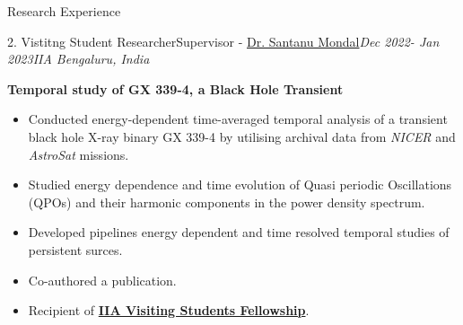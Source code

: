 \begin{section}{Research Experience}
\begin{subsectionnobullet1}{2. Vistitng Student Researcher}{Supervisor - \href{https://www.iiap.res.in/people/profile/academic/santanu-mondal/}{Dr. Santanu Mondal}}{\textit{Dec 2022- Jan 2023}}{\textit{IIA Bengaluru, India}}{}

        \textbf{Temporal study of GX 339-4, a Black Hole Transient}
        \begin{itemize}
            \item Conducted energy-dependent time-averaged temporal analysis of a transient black hole X-ray binary GX 339-4 by utilising archival data from \textit{NICER} and \textit{AstroSat} missions.
            \item Studied energy dependence and time evolution of Quasi periodic Oscillations (QPOs) and their harmonic components in the power density spectrum. 
            \item Developed pipelines energy dependent and time resolved temporal studies of persistent surces. 
            \item Co-authored a publication.
            \item Recipient of \textbf{\href{https://www.iiap.res.in/opportunities/visiting-students/internships/}{IIA Visiting Students Fellowship}}.
        \end{itemize}

    \end{subsectionnobullet1}
\end{section}
